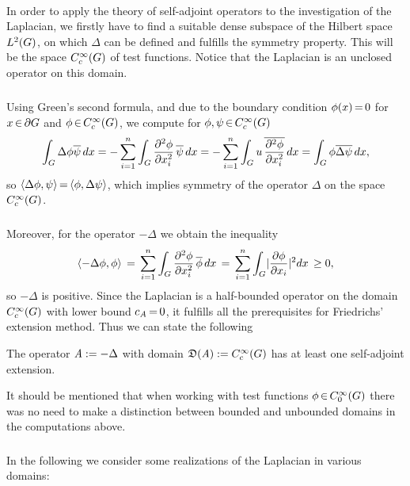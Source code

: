 \documentclass[11pt,twoside]{article}
\begin{document}
\paragraph*{}
In order to apply the theory of self-adjoint operators
to the investigation of the Laplacian,
we firstly have to find a suitable dense subspace
of the Hilbert space $L^2(G)$,
on which $\Delta$ can be defined and fulfills the symmetry property.
This will be the space $C_c^{\infty}(G)$ of test functions.
Notice
that the Laplacian is an unclosed operator on this domain.

\subparagraph*{}
Using Green's second formula,
and due to the boundary condition $\phi(x) {\,=\,} 0$ for $x {\,\in\,} \partial G$
and $\phi {\,\in\,} C_c^{\infty}(G)$,
we compute for $\phi,\psi {\,\in\,} C_c^{\infty}(G)$
\[
\int_{G} \Delta \phi \overline{\psi} \, dx
=
- \sum_{i=1}^n \int_{G}
\frac{\partial^2 \phi}{\partial x_i^2} \, \overline{\psi} \, dx =
- \sum_{i=1}^n \int_{G}
u \, \overline{\frac{\partial^2 \phi}{\partial x_i^2}} \, dx =
\int_{G} \phi \overline{\Delta \psi} \, dx,
\]
so $\langle \Delta \phi,\psi \rangle {\,=\,} \langle \phi,\Delta \psi \rangle$,
which implies symmetry of the operator $\Delta$
on the space $C_c^{\infty}(G)$.

\subparagraph*{}
Moreover,
for the operator $- \Delta$ we obtain the inequality
\[
\scalar{- \Delta \phi}{\phi} \=
\sum_{i=1}^n \int_{\G}
\frac{\partial^2 \phi}{\partial x_i^2} \, \overline{\phi} \, dx
\=
\sum_{i=1}^n \int_{\G} \abs{ \frac{\partial \phi}{\partial x_i}} ^2 dx 
\, \geq 0,
\]
so $-\Delta$ is positive.
Since the Laplacian is a half-bounded operator on the domain
$C_c^{\infty}(G)$ with lower bound $c_{\mathit{A}} {\,=\,} 0$,
it fulfills all the prerequisites for
Friedrichs' extension method.
Thus we can state the following

\begin{theorem}
The operator $\mathit{A} := -\Delta$ with domain
$\mathfrak{D}(\mathit{A}) := C_c^{\infty}(G)$ has at least
one self-adjoint extension.
\end{theorem}

It should be mentioned 
that when working with test functions $\phi {\,\in\,} C_0^{\infty}(G)$
there was no need
to make a distinction between bounded and unbounded domains in the
computations above.

\subsubsection*{} %
In the following we consider some realizations of the Laplacian
in various domains:
\end{document}
